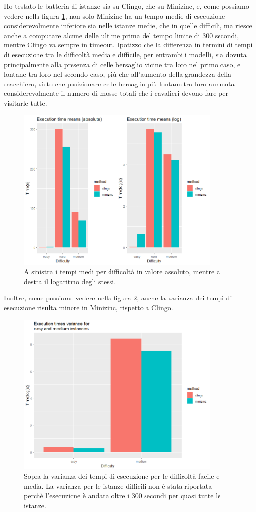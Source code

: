 \documentclass[12pt]{article}
\begin{document}
Ho testato le batteria di istanze sia su Clingo, che su Minizinc, e, come possiamo vedere nella figura \ref{img:time_mean}, non solo Minizinc ha un tempo medio di esecuzione considerevolmente inferiore sia nelle istanze medie, che in quelle difficili, ma riesce anche a computare alcune delle ultime prima del tempo limite di 300 secondi, mentre Clingo va sempre in timeout.
Ipotizzo che la differenza in termini di tempi di esecuzione tra le difficoltà media e difficile, per entrambi i modelli, sia dovuta principalmente alla presenza 
di celle bersaglio vicine tra loro nel primo caso, e lontane tra loro nel secondo caso, più che all'aumento della grandezza della scacchiera, 
visto che posizionare celle bersaglio più lontane tra loro aumenta considerevolmente il numero di mosse totali che i cavalieri devono fare per visitarle tutte.
\begin{figure}[H]
    \centering
    \includegraphics[width=10cm]{time_mean}
    \caption{A sinistra i tempi medi per difficoltà in valore assoluto, mentre a destra il logaritmo degli stessi.}
    \label{img:time_mean}
\end{figure}
Inoltre, come possiamo vedere nella figura \ref{img:time_variance}, anche la varianza dei tempi di esecuzione risulta minore in Minizinc, rispetto a Clingo.
\begin{figure}[H]
    \centering
    \includegraphics[width=10cm]{time_variance}
    \caption{Sopra la varianza dei tempi di esecuzione per le difficoltà facile e media. La varianza per le istanze difficili non è stata riportata perchè l'esecuzione è andata oltre i 300 secondi per quasi tutte le istanze.}
    \label{img:time_variance}
\end{figure}
\end{document}
